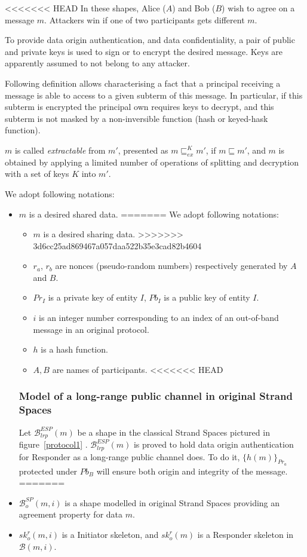 <<<<<<< HEAD
In these shapes, Alice ($A$) and Bob ($B$) wish to agree on a message $m$. Attackers win if one of two participants gets different $m$. 

To provide data origin authentication, and data confidentiality, a pair of public and private keys is used to sign or to encrypt the desired message. Keys are apparently assumed to not belong to any attacker. 

Following definition allows characterising a fact that a principal receiving a message is able to access to a given subterm of this message. In particular, if this subterm is encrypted the principal own requires keys to decrypt, and this subterm is not masked by a non-inversible function (hash or keyed-hask function). 

\begin{Definition}[Extractable]
$m$ is called \emph{extractable} from $m'$, presented as $m \sqsubseteq^K_{ex} m'$, if $m \sqsubseteq m'$, and $m$ is obtained by applying a limited number of operations of splitting and decryption with a set of keys $K$ into $m'$.
\end{Definition}

We adopt following notations: 
\begin{itemize}
\item $m$ is a desired shared data. 
=======
We adopt following notations: 
\begin{itemize}
\item $m$ is a desired sharing data. 
>>>>>>> 3d6cc25ad869467a057daa522b35e3cad82b4604
\item $r_a$, $r_b$ are nonces (pseudo-random numbers) respectively generated by $A$ and $B$. 
\item $Pr_I$ is a private key of entity $I$, $Pb_I$ is a public key of entity $I$. 
\item $i$ is an integer number corresponding to an index of an out-of-band message in an original protocol. 
\item $h$ is a hash function. 
\item $A,B$ are names of participants. 
<<<<<<< HEAD
\end{itemize}

\subsubsection*{Model of a long-range public channel in original Strand Spaces}

Let $\mathcal{B}^{ESP}_{lrp}(m)$ be a shape in the classical Strand Spaces pictured in figure~\ref{protocol1} . $\mathcal{B}^{ESP}_{lrp}(m)$ is proved to hold data origin authentication for Responder as a long-range public channel does. To do it, $\{h(m)\}_{Pr_a}$ protected under $Pb_B$ will ensure both origin and integrity of the message. 
=======
\item $\mathcal{B}^{SP}_o(m,i)$ is a shape modelled in original Strand Spaces providing an agreement property for data $m$. 
\item $sk^r_o(m,i)$ is a Initiator skeleton, and $sk^r_o(m)$ is a Responder skeleton in $\mathcal{B}(m,i)$. 
\end{itemize}

